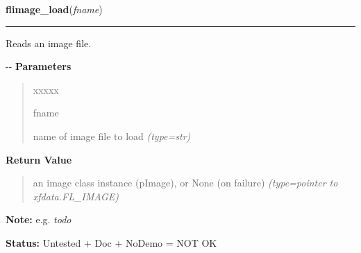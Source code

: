 \hspace{.8\funcindent}\begin{boxedminipage}{\funcwidth}

    \raggedright \textbf{flimage\_load}(\textit{fname})

    \vspace{-1.5ex}

    \rule{\textwidth}{0.5\fboxrule}
\setlength{\parskip}{2ex}

Reads an image file.

-{}-
\setlength{\parskip}{1ex}
      \textbf{Parameters}
      \vspace{-1ex}

      \begin{quote}
        \begin{Ventry}{xxxxx}

          \item[fname]


name of image file to load
            {\it (type=str)}

        \end{Ventry}

      \end{quote}

      \textbf{Return Value}
    \vspace{-1ex}

      \begin{quote}

an image class instance (pImage), or None (on failure)
      {\it (type=pointer to xfdata.FL\_IMAGE)}

      \end{quote}

\textbf{Note:} 
e.g. \emph{todo}


\textbf{Status:} 
Untested + Doc + NoDemo = NOT OK


    \end{boxedminipage}

    \label{xformslib:flflimage:flimage_read}

    \vspace{0.5ex}

